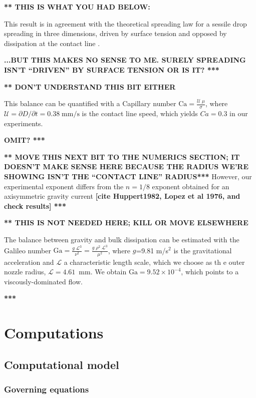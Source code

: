 \documentclass[aip,graphicx]{revtex4-1}
\newcommand{\sym}[1]{\text{#1}} \newcommand{\dif}{\mathrm{d}}
\begin{document}
{\bf *** THIS IS WHAT YOU HAD BELOW:} 

This result is in agreement with the
theoretical spreading law for a sessile drop spreading in three
dimensions, driven by surface tension and opposed by dissipation at
the contact line \cite{bonn2009wetting, cazabat1986dynamics}. 

{\bf ...BUT THIS MAKES NO SENSE TO ME. SURELY SPREADING ISN'T ``DRIVEN'' BY
SURFACE TENSION OR IS IT? ***}

{\bf *** DON'T UNDERSTAND THIS BIT EITHER}

 This
balance can be quantified with a Capillary number $\displaystyle
\sym{Ca} = \frac{\mathcal{U} \; \mu}{\sigma}$, where
$\mathcal{U}=\partial D/ \partial t=0.38 \; \sym{mm/s}$ is the contact
line speed, which yields $Ca=0.3$ in our experiments.

{\bf OMIT? ***}


{\bf *** MOVE THIS NEXT BIT TO THE NUMERICS SECTION; IT DOESN'T MAKE SENSE
HERE BECAUSE THE RADIUS WE'RE SHOWING ISN'T THE ``CONTACT LINE''
RADIUS*** } However, our
experimental exponent differs from the $n=1/8$ exponent obtained for
an axisymmetric gravity current {\bf [cite Huppert1982, Lopez et al
    1976, and check results] ***} 


{\bf *** THIS IS NOT NEEDED HERE; KILL OR MOVE ELSEWHERE }

The balance between gravity and bulk dissipation can be estimated with
the Galileo number $\displaystyle \sym{Ga} = \frac{g \;
  \mathcal{L}^3}{\nu^2} = \frac{g \; \rho^2 \; \mathcal{L}^3}{\mu^2}$,
where $g$=9.81 m/s$^2$ is the gravitational acceleration and
$\mathcal{L}$ a characteristic length scale, which we choose as th e
outer nozzle radius, $\mathcal{L}=4.61$~mm.  We obtain $\sym{Ga}=9.52
\times 10^{-4}$, which points to a viscously-dominated flow.

{\bf ****}


\section{Computations}

\subsection{Computational model}

\subsubsection{Governing equations}
\end{document}
